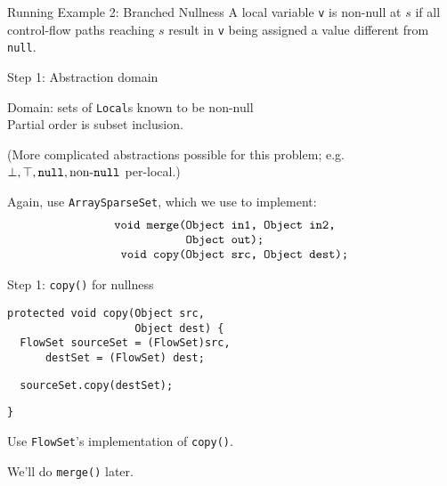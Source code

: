
\begin{slide}{Running Example 2: Branched Nullness}
\vspace*{-0.2in} 
A local variable {\tt v} is {\red non-null} at $s$ if all
control-flow paths reaching $s$ result in {\tt v} being
assigned a value different from {\tt null}.

\begin{center}

\end{center}
\end{slide}

\begin{slide}{Step 1: Abstraction domain}
\vspace*{-0.2in}

Domain: sets of {\tt Local}s known to be non-null\\
Partial order is subset inclusion.

\quad

(More complicated abstractions possible for this problem; e.g. 
$\perp, \top, \mbox{\tt null}, \mbox{non-{\tt null}}$ per-local.)

\quad

Again, use {\tt ArraySparseSet}, which we use to implement:
{\small 
\[ \mbox{\tt \begin{tabular}{r@{}l}
                 void merge(&Object in1, Object in2,\\
                            &Object out);\\
                 void copy(&Object src, Object dest);
\end{tabular}}\]
}
\end{slide}

\begin{slide}{Step 1: {\tt copy()} for nullness}
\begin{verbatim}
protected void copy(Object src, 
                    Object dest) {
  FlowSet sourceSet = (FlowSet)src,
      destSet = (FlowSet) dest;

\end{verbatim}    
{\red\verb+  sourceSet.copy(destSet);+}
\begin{verbatim}
}
\end{verbatim}

\qquad

Use {\tt FlowSet}'s implementation of {\tt copy()}.

\qquad

We'll do {\tt merge()} later.
\end{slide}

